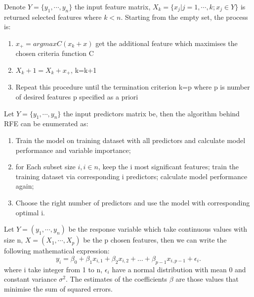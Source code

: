 \begin{defn}\label{Definition of Sequential Forward Selection}
Denote $Y=\{y_1,\cdots,y_n\}$ the input feature matrix, $X_k =\{x_j|j=1,\cdots,k; x_j\in Y\}$ is returned selected features where $k<n$. Starting from the empty set, the process is:
\begin{enumerate}
   \item $x_{+}=arg max C(x_k+x)$ get the additional feature which maximises the chosen criteria function C
   \item $X_k+1=X_k+x_{+}$, k=k+1
   \item Repeat this procedure until the termination criterion k=p where p is number of desired features p specified as a priori 
\end{enumerate}
\end{defn}

\begin{defn}\label{Definition of RFE}
Let $Y=\{y_1,\cdots,y_n\}$ the input predictors matrix be, then the algorithm behind RFE can be enumerated as:
\begin{enumerate}
   \item Train the model on training dataset with all predictors and calculate model performance and variable importance;
   \item for Each subset size $i,i\in n$, keep the i most significant features; train the training dataset via corresponding i predictors; calculate model performance again;
   \item Choose the right number of predictors and use the model with corresponding optimal i. 
\end{enumerate}
\end{defn}

\begin{defn}\label{Definition of Linear Regression}
Let $Y = (y_1,\cdots ,y_n)$ be the response variable which take continuous values with size n, $X = (X_1,\cdots ,X_p)$ be the p chosen features, then we can write the following mathematical expression:
\begin{equation}
y_{i}=\beta_{0}+\beta_{1}x_{i,1}+\beta_{2}x_{i,2}+\ldots+\beta_{p-1}x_{i,p-1}+\epsilon_{i}.
\end{equation}
where i take integer from 1 to n, $\epsilon_{i}$  have a normal distribution with mean 0 and constant variance $\sigma^{2}$. The estimates of the coefficients $\beta$ are those values that minimise the sum of squared errors.
\end{defn}

